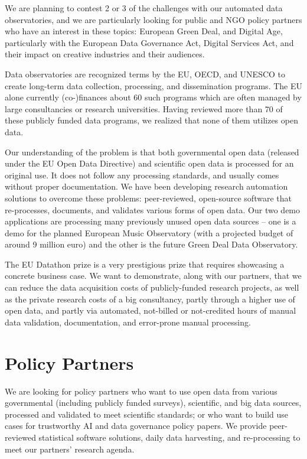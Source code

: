 \documentclass[
  a4paper,
  openany, a4paper, oneside]{book}
\begin{document}
We are planning to contest 2 or 3 of the challenges with our automated data observatories, and we are particularly looking for public and NGO policy partners who have an interest in these topics: European Green Deal, and Digital Age, particularly with the European Data Governance Act, Digital Services Act, and their impact on creative industries and their audiences.

Data observatories are recognized terms by the EU, OECD, and UNESCO to create long-term data collection, processing, and dissemination programs. The EU alone currently (co-)finances about 60 such programs which are often managed by large consultancies or research universities. Having reviewed more than 70 of these publicly funded data programs, we realized that none of them utilizes open data.

Our understanding of the problem is that both governmental open data (released under the EU Open Data Directive) and scientific open data is processed for an original use. It does not follow any processing standards, and usually comes without proper documentation. We have been developing research automation solutions to overcome these problems: peer-reviewed, open-source software that re-processes, documents, and validates various forms of open data. Our two demo applications are processing many previously unused open data sources -- one is a demo for the planned European Music Observatory (with a projected budget of around 9 million euro) and the other is the future Green Deal Data Observatory.

The EU Datathon prize is a very prestigious prize that requires showcasing a concrete business case. We want to demonstrate, along with our partners, that we can reduce the data acquisition costs of publicly-funded research projects, as well as the private research costs of a big consultancy, partly through a higher use of open data, and partly via automated, not-billed or not-credited hours of manual data validation, documentation, and error-prone manual processing.

\hypertarget{policy-partners}{%
\section{Policy Partners}\label{policy-partners}}

We are looking for policy partners who want to use open data from various governmental (including publicly funded surveys), scientific, and big data sources, processed and validated to meet scientific standards; or who want to build use cases for trustworthy AI and data governance policy papers. We provide peer-reviewed statistical software solutions, daily data harvesting, and re-processing to meet our partners' research agenda.
\end{document}
